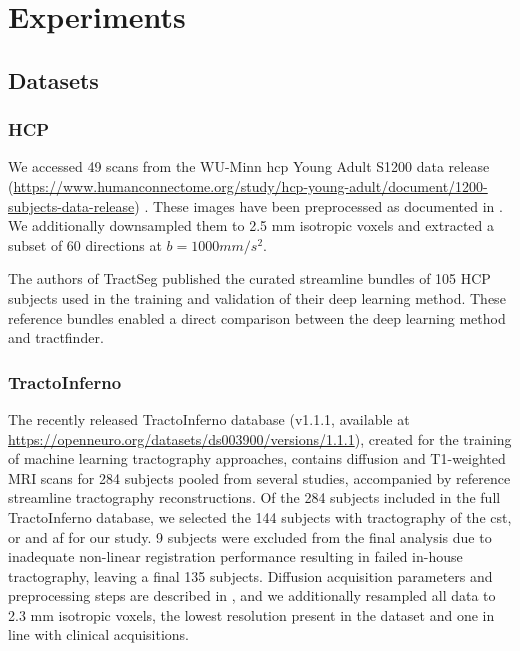 \chapter{Experiments}
\label{}


\section{Datasets}
\label{sec:data}



\subsection{HCP}

We accessed 49 scans from the WU-Minn \gls{hcp} Young Adult S1200 data release (\url{https://www.humanconnectome.org/study/hcp-young-adult/document/1200-subjects-data-release}) \autocite{VanEssen2013}.
These images have been preprocessed as documented in \textcite{Glasser2013}.
We additionally downsampled them to 2.5 mm isotropic voxels and extracted a subset of 60 directions at $b=1000 mm/s^2$.

The authors of TractSeg\autocite{Wasserthal2018} published the curated streamline bundles of 105 HCP subjects used in the training and validation of their deep learning method.
These reference bundles enabled a direct comparison between the deep learning method and tractfinder.

\subsection{TractoInferno}

The recently released TractoInferno database (v1.1.1, available at \url{https://openneuro.org/datasets/ds003900/versions/1.1.1}),\autocite{Poulin2022} created for the training of machine learning tractography approaches, contains diffusion and T1-weighted MRI scans for 284 subjects pooled from several studies, accompanied by reference streamline tractography reconstructions.
Of the 284 subjects included in the full TractoInferno database, we selected the 144 subjects with tractography of the \gls{cst}, \gls{or} and \gls{af} for our study.
9 subjects were excluded from the final analysis due to inadequate non-linear registration performance resulting in failed in-house tractography, leaving a final 135 subjects.
Diffusion acquisition parameters and preprocessing steps are described in \textcite{Poulin2022}, and we additionally resampled all data to 2.3 mm isotropic voxels, the lowest resolution present in the dataset and one in line with clinical acquisitions.

